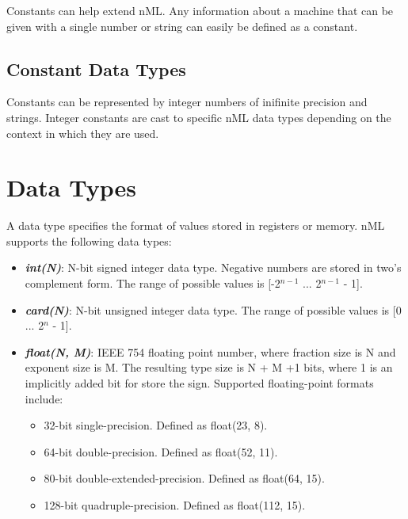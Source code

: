 \documentclass[oneside,final,14pt]{extreport}
\begin{document}
Constants can help extend nML. Any information about a machine that can be given with
a single number or string can easily be defined as a constant.

\subsection{Constant Data Types}

Constants can be represented by integer numbers of inifinite precision and strings.
Integer constants are cast to specific nML data types depending on the context in
which they are used.


\section{Data Types}

A data type specifies the format of values stored in registers or memory.
nML supports the following data types:

\begin{itemize}

\item \textbf{\textit{int(N)}}:
N-bit signed integer data type. Negative numbers are stored in two's complement
form. The range of possible values is [-2$^{n-1}$ ... 2$^{n-1}$ - 1].

\item \textbf{\textit{card(N)}}:
N-bit unsigned integer data type. The range of possible values is [0 ... 2$^n$ - 1].

\item \textbf{\textit{float(N, M)}}: IEEE 754 floating point number, where fraction
size is N and exponent size is M. The resulting type size is N + M +1 bits, where 1
is an implicitly added bit for store the sign. Supported floating-point formats include:

\begin{itemize}
\item 32-bit single-precision. Defined as float(23, 8).
\item 64-bit double-precision. Defined as float(52, 11).
\item 80-bit double-extended-precision. Defined as float(64, 15).
\item 128-bit quadruple-precision. Defined as float(112, 15).
\end{itemize}

\end{itemize}
\end{document}
